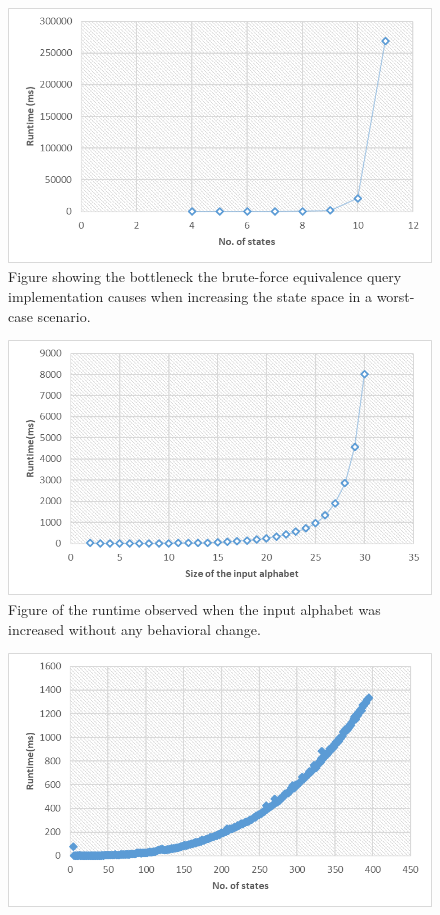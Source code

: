 \begin{figure}
	\centering
	\includegraphics[width=0.7\linewidth]{figures/stateruntime}
	\caption{Figure showing the bottleneck the brute-force equivalence query implementation causes when increasing the state space in a worst-case scenario.}
	\label{fig:stateruntime}
\end{figure}

\begin{figure}
	\centering
	\includegraphics[width=0.7\linewidth]{figures/inputruntime}
	\caption{Figure of the runtime observed when the input alphabet was increased without any behavioral change.}
	\label{fig:inputruntime}
\end{figure}


\begin{figure}
	\centering
	\includegraphics[width=0.7\linewidth]{figures/inputruntime1}
	\caption{}
	\label{fig:inputruntime1}
\end{figure}
